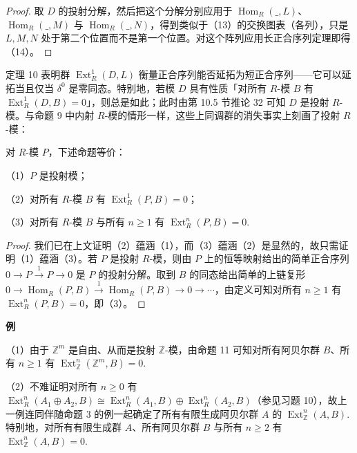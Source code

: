 \begin{proof}
取 \(D\) 的投射分解，然后把这个分解分别应用于 \(\operatorname{Hom}_R(\_, L)\)、\(\operatorname{Hom}_R(\_, M)\) 与 \(\operatorname{Hom}_R(\_, N)\)，得到类似于（13）的交换图表（各列），只是 \(L, M, N\) 处于第二个位置而不是第一个位置。对这个阵列应用长正合序列定理即得（14）。
\end{proof}

定理 10 表明群 \(\operatorname{Ext}_R^1(D, L)\) 衡量正合序列能否延拓为短正合序列——它可以延拓当且仅当 \(\delta^0\) 是零同态。特别地，若模 \(D\) 具有性质「对所有 \(R\)-模 \(B\) 有 \(\operatorname{Ext}_R^1(D, B) = 0\)」，则总是如此；此时由第 10.5 节推论 32 可知 \(D\) 是投射 \(R\)-模。与命题 9 中内射 \(R\)-模的情形一样，这些上同调群的消失事实上刻画了投射 \(R\)-模：

\begin{proposition}\label{pro:17.11}
对 \(R\)-模 \(P\)，下述命题等价：

（1）\(P\) 是投射模；

（2）对所有 \(R\)-模 \(B\) 有 \(\operatorname{Ext}_R^1(P, B) = 0\)；

（3）对所有 \(R\)-模 \(B\) 与所有 \(n \geq 1\) 有 \(\operatorname{Ext}_R^n(P, B) = 0\).
\end{proposition}

\begin{proof}
我们已在上文证明（2）蕴涵（1），而（3）蕴涵（2）是显然的，故只需证明（1）蕴涵（3）。若 \(P\) 是投射 \(R\)-模，则由 \(P\) 上的恒等映射给出的简单正合序列 \(0 \to P \xrightarrow{1} P \to 0\) 是 \(P\) 的投射分解。取到 \(B\) 的同态给出简单的上链复形 \(0 \to \operatorname{Hom}_R(P, B) \xrightarrow{1} \operatorname{Hom}_R(P, B) \to 0 \to \cdots\)，由定义可知对所有 \(n \geq 1\) 有 \(\operatorname{Ext}_R^n(P, B) = 0\)，即（3）。
\end{proof}

\noindent\textbf{例}

（1）由于 \(\mathbb{Z}^m\) 是自由、从而是投射 \(\mathbb{Z}\)-模，由命题 11 可知对所有阿贝尔群 \(B\)、所有 \(n \geq 1\) 有 \(\operatorname{Ext}_{\mathbb{Z}}^n(\mathbb{Z}^m, B) = 0\).

（2）不难证明对所有 \(n \geq 0\) 有 \(\operatorname{Ext}_R^n(A_1 \oplus A_2, B) \cong \operatorname{Ext}_R^n(A_1, B) \oplus \operatorname{Ext}_R^n(A_2, B)\)（参见习题 10），故上一例连同伴随命题 3 的例一起确定了所有有限生成阿贝尔群 \(A\) 的 \(\operatorname{Ext}_{\mathbb{Z}}^n(A, B)\). 特别地，对所有有限生成群 \(A\)、所有阿贝尔群 \(B\) 与所有 \(n \geq 2\) 有 \(\operatorname{Ext}_{\mathbb{Z}}^n(A, B) = 0\).

